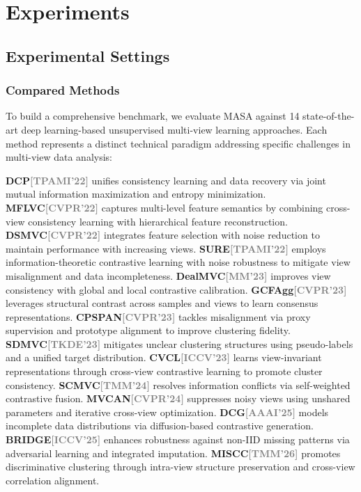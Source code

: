 \documentclass[10pt, journal, compsoc]{IEEEtran}
\begin{document}
\section{Experiments}
\subsection{Experimental Settings}
\subsubsection{Compared Methods}

To build a comprehensive benchmark, we evaluate MASA against 14 state-of-the-art deep learning-based unsupervised multi-view learning approaches. Each method represents a distinct technical paradigm addressing specific challenges in multi-view data analysis:

\textbf{DCP{\tiny\textcolor{gray}{[TPAMI'22]}}\cite{lin2022dual}} unifies consistency learning and data recovery via joint mutual information maximization and entropy minimization.
\textbf{MFLVC{\tiny\textcolor{gray}{[CVPR'22]}}\cite{MFLVCxu2022multi}} captures multi-level feature semantics by combining cross-view consistency learning with hierarchical feature reconstruction.
\textbf{DSMVC{\tiny\textcolor{gray}{[CVPR'22]}}\cite{DSMVCtang2022deep}} integrates feature selection with noise reduction to maintain performance with increasing views.
\textbf{SURE{\tiny\textcolor{gray}{[TPAMI'22]}}\cite{SUREyang2022robust}} employs information-theoretic contrastive learning with noise robustness to mitigate view misalignment and data incompleteness.
\textbf{DealMVC{\tiny\textcolor{gray}{[MM'23]}}\cite{Dealmvcyang2023dealmvc}} improves view consistency with global and local contrastive calibration.
\textbf{GCFAgg{\tiny\textcolor{gray}{[CVPR'23]}}\cite{Gcfaggyan2023gcfagg}} leverages structural contrast across samples and views to learn consensus representations.
\textbf{CPSPAN{\tiny\textcolor{gray}{[CVPR'23]}}\cite{CPSPANjin2023deep}} tackles misalignment via proxy supervision and prototype alignment to improve clustering fidelity.
\textbf{SDMVC{\tiny\textcolor{gray}{[TKDE'23]}}\cite{SDMVCxu2023self}} mitigates unclear clustering structures using pseudo-labels and a unified target distribution.
\textbf{CVCL{\tiny\textcolor{gray}{[ICCV'23]}}\cite{CVCLchen2023deep}} learns view-invariant representations through cross-view contrastive learning to promote cluster consistency. \textbf{SCMVC{\tiny\textcolor{gray}{[TMM'24]}}\cite{SCMVCwu2024self}} resolves information conflicts via self-weighted contrastive fusion. \textbf{MVCAN{\tiny\textcolor{gray}{[CVPR'24]}}\cite{MVCANxu2024investigating}} suppresses noisy views using unshared parameters and iterative cross-view optimization.
\textbf{DCG{\tiny\textcolor{gray}{[AAAI'25]}}\cite{zhang2025incomplete}} models incomplete data distributions via diffusion-based contrastive generation.
\textbf{BRIDGE{\tiny\textcolor{gray}{[ICCV'25]}}\cite{jiang2025unified}} enhances robustness against non-IID missing patterns via adversarial learning and integrated imputation.
\textbf{MISCC{\tiny\textcolor{gray}{[TMM'26]}}\cite{li2026deep}} promotes discriminative clustering through intra-view structure preservation and cross-view correlation alignment.
\end{document}
